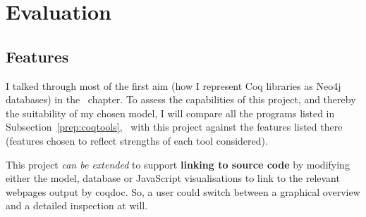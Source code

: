 \chapter{Evaluation}\label{chapter:evaluation}


%

\section{Features}\label{eval:compare}

I talked through most of the first aim (how I represent Coq libraries as Neo4j
databases) in the~ chapter. To assess the capabilities of
this project, and thereby the suitability of my chosen model, I will compare all
the programs listed in Subsection~\ref{prep:coqtools},~
with this project against the features listed there (features chosen to reflect
strengths of each tool considered).

This project \emph{can be extended} to support \textbf{linking to source code} by
modifying either the model, database or JavaScript visualisations to link to the
relevant webpages output by coqdoc.  So, a user could switch between a graphical
overview and a detailed inspection at will.

